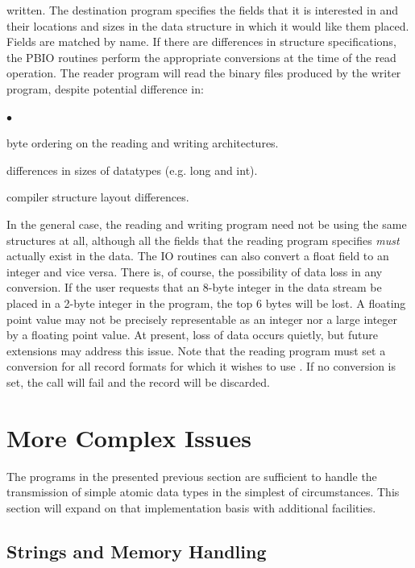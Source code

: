 written.  The destination program specifies the fields that it is interested
in and their locations and sizes in the data structure in which it would like
them placed. Fields are matched by name.  If there are differences in
structure specifications, the PBIO routines perform the appropriate
conversions at the time of the read operation.  The reader program will read
the binary files produced by the writer program, despite potential difference
in: 
\begin{list}{$\bullet$\hfill}{\let\makelabel\descriptionlabel\setlength{\itemsep}{0in}\setlength{\topsep}{0in}}
\item byte ordering on the reading and writing architectures.
\item differences in sizes of datatypes (e.g. long and int).
\item compiler structure layout differences.
\end{list}
In the general case, the reading and writing program need not be using the
same structures at all, although all the fields that the reading program
specifies {\em must} actually exist in the data.  The IO routines can also
convert a float field to an integer and vice versa.  There is, of
course, the possibility of data loss in any conversion.  If the user requests
that an 8-byte integer in the data stream be placed in a 2-byte integer in the
program, the top 6 bytes will be lost.  A floating point value may not be
precisely representable as an integer nor a large integer by a floating point
value.  At present, loss of data occurs quietly, but future extensions may
address this issue.  Note that the reading program must set a conversion
for all record formats for which it wishes to use .  If no
conversion is set, the  call will fail and the record will be
discarded.  

\section{More Complex Issues}
The programs in the presented previous section are sufficient to handle the
transmission of simple atomic data types in the simplest of circumstances.
This section will expand on that implementation basis with additional
facilities. 

\subsection{Strings and Memory Handling\label{stringmem}}

